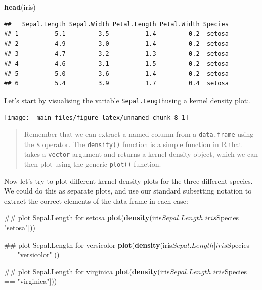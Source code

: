 \documentclass[]{book}
\newenvironment{Shaded}{\begin{snugshade}}{\end{snugshade}}
\newcommand{\KeywordTok}[1]{\textcolor[rgb]{0.13,0.29,0.53}{\textbf{{#1}}}}
\newcommand{\StringTok}[1]{\textcolor[rgb]{0.31,0.60,0.02}{{#1}}}
\newcommand{\NormalTok}[1]{{#1}}
\theoremstyle{definition}
\theoremstyle{definition}
\theoremstyle{definition}
\theoremstyle{remark}
\begin{document}
\begin{Shaded}
\begin{Highlighting}[]
\KeywordTok{head}\NormalTok{(iris)}
\end{Highlighting}
\end{Shaded}

\begin{verbatim}
##   Sepal.Length Sepal.Width Petal.Length Petal.Width Species
## 1          5.1         3.5          1.4         0.2  setosa
## 2          4.9         3.0          1.4         0.2  setosa
## 3          4.7         3.2          1.3         0.2  setosa
## 4          4.6         3.1          1.5         0.2  setosa
## 5          5.0         3.6          1.4         0.2  setosa
## 6          5.4         3.9          1.7         0.4  setosa
\end{verbatim}

Let's start by visualising the variable \texttt{Sepal.Length}using a
kernel density plot:.

\begin{Shaded}
\end{Shaded}

\begin{center}\texttt{[image: \_main\_files/figure-latex/unnamed-chunk-8-1]} \end{center}

\begin{quote}
Remember that we can extract a named column from a \texttt{data.frame}
using the \texttt{\$} operator. The \texttt{density()} function is a
simple function in R that takes a \texttt{vector} argument and returns a
kernel density object, which we can then plot using the generic
\texttt{plot()} function.
\end{quote}

Now let's try to plot different kernel density plots for the three
different species. We could do this as separate plots, and use our
standard subsetting notation to extract the correct elements of the data
frame in each case:

\begin{Shaded}
\begin{Highlighting}[]
\NormalTok{## plot Sepal.Length for setosa}
\KeywordTok{plot}\NormalTok{(}\KeywordTok{density}\NormalTok{(iris$Sepal.Length[iris$Species ==}\StringTok{ "setosa"}\NormalTok{]))}

\NormalTok{## plot Sepal.Length for versicolor}
\KeywordTok{plot}\NormalTok{(}\KeywordTok{density}\NormalTok{(iris$Sepal.Length[iris$Species ==}\StringTok{ "versicolor"}\NormalTok{]))}

\NormalTok{## plot Sepal.Length for virginica}
\KeywordTok{plot}\NormalTok{(}\KeywordTok{density}\NormalTok{(iris$Sepal.Length[iris$Species ==}\StringTok{ "virginica"}\NormalTok{]))}
\end{Highlighting}
\end{Shaded}
\end{document}
